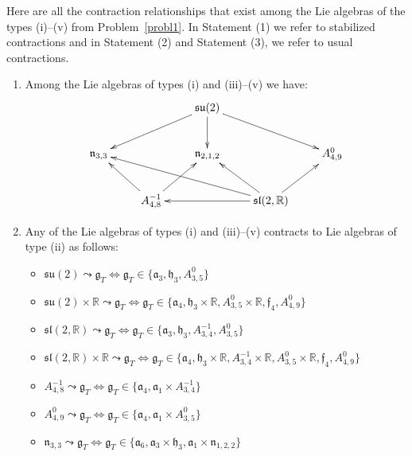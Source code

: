 \documentclass[
reqno]{amsart}
\begin{document}
\begin{theorem}\label{main}
Here are all the contraction relationships that exist among the Lie algebras of the types (i)--(v) 
from Problem~\ref{probl1}.  In Statement (1) we refer to stabilized contractions and in Statement (2) and Statement (3),
we refer to usual contractions.
\begin{enumerate}
\item\label{main_item1} 
Among the Lie algebras of types (i) and (iii)--(v) we have: 
$$\xymatrix{
 &  & {{\mathfrak s}{\mathfrak u}}(2) \ar[dll] \ar[d] \ar[drr]& & \\
 {{\mathfrak n}}_{3,3}&  & {{\mathfrak n}}_{2,1,2}& & A_{4,9}^0 \\
 &A_{4,8}^{-1} \ar[ul] \ar[ur]  & &{{\mathfrak s}{\mathfrak l}}(2,{{\mathbb R}}) \ar[ulll] \ar[ul] \ar[ur] \ar[ll]&  
}$$
\item\label{main_item2} 
Any of the Lie algebras of types (i) and (iii)--(v) contracts to Lie algebras of type (ii) as follows: 
\begin{itemize}
\item ${{\mathfrak s}{\mathfrak u}}(2){\leadsto}{{\mathfrak g}}_T\iff{{\mathfrak g}}_T\in\{{{\mathfrak a}}_3, {{\mathfrak h}}_3, A_{3,5}^0\}$
\item ${{\mathfrak s}{\mathfrak u}}(2)\times{{\mathbb R}}{\leadsto}{{\mathfrak g}}_T\iff{{\mathfrak g}}_T\in\{{{\mathfrak a}}_4, {{\mathfrak h}}_3\times{{\mathbb R}}, A_{3,5}^0\times{{\mathbb R}}, {{\mathfrak f}}_4, A_{4,9}^0\}$ 
\item ${{\mathfrak s}{\mathfrak l}}(2,{{\mathbb R}}){\leadsto}{{\mathfrak g}}_T\iff{{\mathfrak g}}_T\in\{{{\mathfrak a}}_3, {{\mathfrak h}}_3, A_{3,4}^{-1}, A_{3,5}^0\}$ 
\item ${{\mathfrak s}{\mathfrak l}}(2,{{\mathbb R}})\times{{\mathbb R}}{\leadsto}{{\mathfrak g}}_T\Leftrightarrow{{\mathfrak g}}_T\in\{{{\mathfrak a}}_4, {{\mathfrak h}}_3\times{{\mathbb R}}, A_{3,4}^{-1}\times{{\mathbb R}}, 
A_{3,5}^0\times{{\mathbb R}}, {{\mathfrak f}}_4, A_{4,9}^0\}$
\item $A_{4,8}^{-1}{\leadsto}{{\mathfrak g}}_T 
\iff {{\mathfrak g}}_T\in\{{{\mathfrak a}}_4,{{\mathfrak a}}_1 \times A_{3,4}^{-1}\}$
\item $A_{4,9}^0 {\leadsto}{{\mathfrak g}}_T 
\iff {{\mathfrak g}}_T\in\{{{\mathfrak a}}_4,{{\mathfrak a}}_1 \times A_{3,5}^0\}$ 
\item ${{\mathfrak n}}_{3,3} {\leadsto}{{\mathfrak g}}_T 
\iff {{\mathfrak g}}_T\in\{{{\mathfrak a}}_6,{{\mathfrak a}}_3\times {{\mathfrak h}}_3,{{\mathfrak a}}_1\times{{\mathfrak n}}_{1,2,2}\}$

\end{itemize}
\end{enumerate}
\end{theorem}
\end{document}
